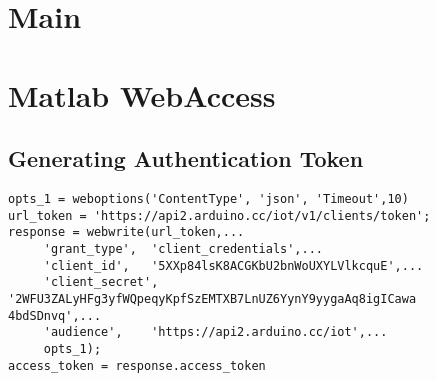 \section*{Main}
\label{Firmware Main}

\section*{Matlab WebAccess}
\subsection*{Generating Authentication Token} \label{CREATING TOKEN}
\begin{lstlisting}[style=Matlab-Pyglike]
%:::::::::::::::CREATING TOKEN:::::::::::::::
opts_1 = weboptions('ContentType', 'json', 'Timeout',10)
url_token = 'https://api2.arduino.cc/iot/v1/clients/token';
response = webwrite(url_token,...
     'grant_type',  'client_credentials',...
     'client_id',   '5XXp84lsK8ACGKbU2bnWoUXYLVlkcquE',...
     'client_secret', '2WFU3ZALyHFg3yfWQpeqyKpfSzEMTXB7LnUZ6YynY9yygaAq8igICawa 4bdSDnvq',...
     'audience',    'https://api2.arduino.cc/iot',...
     opts_1);
access_token = response.access_token
\end{lstlisting}

